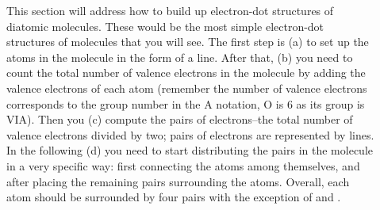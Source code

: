 \documentclass[main.tex]{subfiles}
\begin{document}
\begin{description}
\item[] This section will address how to build up electron-dot structures of diatomic molecules. These would be the most simple electron-dot structures of molecules that you will see. The first step is (a) to set up the atoms in the molecule in the form of a line. After that, (b) you need to count the total number of valence electrons in the molecule by adding the valence electrons of each atom (remember the number of valence electrons corresponds to the group number in the A notation, O is 6 as its group is VIA). Then you (c) compute the pairs of electrons--the total number of valence electrons divided by two; pairs of electrons are represented by lines. In the following (d) you need to start distributing the pairs in the molecule in a very specific way: first connecting the atoms among themselves, and after placing the remaining pairs surrounding the atoms. Overall, each atom should be surrounded by four pairs with the exception of  and .


\end{description}
\end{document}
